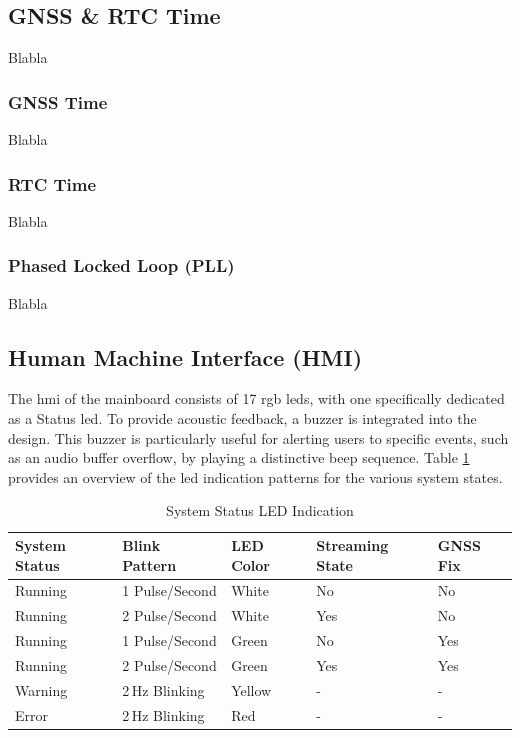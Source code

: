 \subsection{GNSS \& RTC Time}
Blabla

\subsubsection{GNSS Time}
Blabla

\subsubsection{RTC Time}
Blabla

\subsubsection{Phased Locked Loop (PLL)}
Blabla

\subsection{Human Machine Interface (HMI)}
The \acrfull{hmi} of the mainboard consists of 17 \acrshort{rgb} \acrshort{led}s, with one specifically dedicated as a Status \acrshort{led}.
To provide acoustic feedback, a buzzer is integrated into the design.
This buzzer is particularly useful for alerting users to specific events, such as an audio buffer overflow, by playing a distinctive beep sequence.
Table \ref{tab:system_status_led} provides an overview of the \acrshort{led} indication patterns for the various system states.
\begin{table}
	\centering
	\begin{tabular}{ l l l l l}
		\textbf{System Status} & \textbf{Blink Pattern} & \textbf{LED Color} & \textbf{Streaming State} & \textbf{GNSS Fix} \vspace{0.1cm} \\ \hline
		Running                & 1 Pulse/Second         & White              & No                       & No                               \\ \hline
		Running                & 2 Pulse/Second         & White              & Yes                      & No                               \\ \hline
		Running                & 1 Pulse/Second         & Green              & No                       & Yes                              \\ \hline
		Running                & 2 Pulse/Second         & Green              & Yes                      & Yes                              \\ \hline
		Warning                & 2\,Hz Blinking         & Yellow             & -                        & -                                \\ \hline
		Error                  & 2\,Hz Blinking         & Red                & -                        & -                                \\ \hline
	\end{tabular}
	\caption{System Status LED Indication}
	\label{tab:system_status_led}
\end{table}


